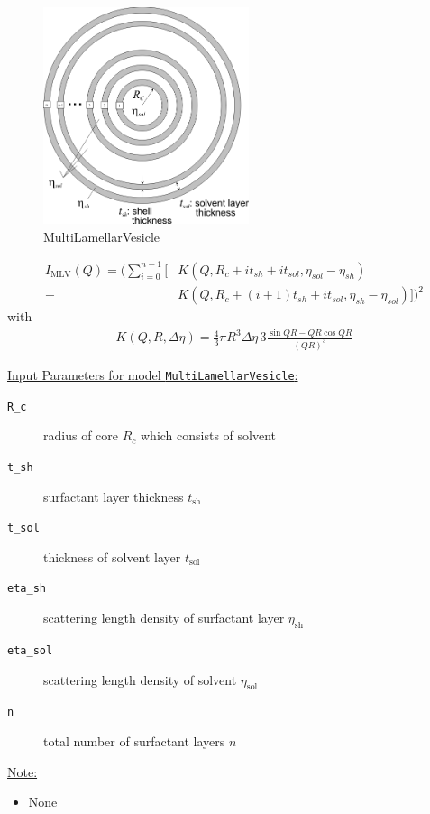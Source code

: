 \begin{figure}[htb]
\begin{center}
\includegraphics[width=0.537\textwidth]{../images/form_factor/spheres/multilamellar_vesicle.png}
\end{center}
\caption{MultiLamellarVesicle} \label{fig:MultiLamellarVesicle}
\end{figure}
\begin{align}
I_\text{MLV}(Q) = \Bigg( \sum_{i=0}^{n-1} \bigg[ & K(Q,R_c+it_{sh}+it_{sol},\eta_{sol}-\eta_{sh}) \nonumber \\
+ &K(Q,R_c+(i+1)t_{sh}+it_{sol},\eta_{sh}-\eta_{sol}) \bigg]
\Bigg)^2
\end{align}
with
\begin{align}
 K(Q,R,\Delta\eta) = \frac{4}{3}\pi R^3 \Delta\eta \, 3 \frac{\sin QR - QR \cos QR}{(QR)^3}
\end{align}


\noindent\uline{Input Parameters for model \texttt{MultiLamellarVesicle}:}
\begin{description}
\item[\texttt{R\_c}] radius of core $R_c$ which consists of solvent
\item[\texttt{t\_sh}] surfactant layer thickness $t_\text{sh}$
\item[\texttt{t\_sol}] thickness of solvent layer $t_\text{sol}$
\item[\texttt{eta\_sh}] scattering length density of surfactant layer $\eta_\text{sh}$
\item[\texttt{eta\_sol}] scattering length density of solvent $\eta_\text{sol}$
\item[\texttt{n}] total number of surfactant layers $n$
\end{description}

\noindent\uline{Note:}
\begin{itemize}
\item[~] None
\end{itemize}


